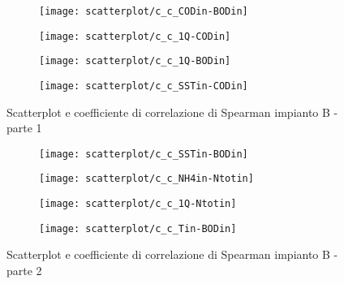\begin{sidewaysfigure}[h]
	\renewcommand*\thesubfigure{(\arabic{subfigure})}
	\begin{subfigure}{0.49\textwidth}
		\texttt{[image: scatterplot/c\_c\_CODin-BODin]}
		\caption{}
		\centering
	\end{subfigure}
	\begin{subfigure}{0.49\textwidth}
		\texttt{[image: scatterplot/c\_c\_1Q-CODin]}
		\caption{}
		\centering
	\end{subfigure}

	\begin{subfigure}{0.49\textwidth}
		\texttt{[image: scatterplot/c\_c\_1Q-BODin]}
		\caption{}
		\centering
	\end{subfigure}
	\begin{subfigure}{0.49\textwidth}
		\texttt{[image: scatterplot/c\_c\_SSTin-CODin]}	
		\caption{}
		\centering
	\end{subfigure}
	\caption{Scatterplot e coefficiente di correlazione di Spearman impianto B - parte 1}
	\label{fig:c_corr4}
\end{sidewaysfigure}

\begin{sidewaysfigure}[h]\ContinuedFloat
	\renewcommand*\thesubfigure{(\arabic{subfigure})}
	\begin{subfigure}{0.49\textwidth}
		\texttt{[image: scatterplot/c\_c\_SSTin-BODin]}
		\caption{}
		\centering
	\end{subfigure}
	\begin{subfigure}{0.49\textwidth}
		\texttt{[image: scatterplot/c\_c\_NH4in-Ntotin]}
		\caption{}
		\centering
	\end{subfigure}

	\begin{subfigure}{0.49\textwidth}
		\texttt{[image: scatterplot/c\_c\_1Q-Ntotin]}
		\caption{}
		\centering
	\end{subfigure}
	\begin{subfigure}{0.49\textwidth}
		\texttt{[image: scatterplot/c\_c\_Tin-BODin]}	
		\caption{}
		\centering
	\end{subfigure}
	\caption{Scatterplot e coefficiente di correlazione di Spearman impianto B - parte 2}
\end{sidewaysfigure}

